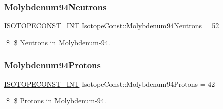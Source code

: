 \subsubsection{\texorpdfstring{Molybdenum94\+Neutrons}{Molybdenum94Neutrons}}
{\footnotesize\ttfamily \mbox{\hyperlink{group___isotope_const-_macros_ga5f18360b3e99483a35c32d789e62621c}{I\+S\+O\+T\+O\+P\+E\+C\+O\+N\+S\+T\+\_\+\+I\+NT}} Isotope\+Const\+::\+Molybdenum94\+Neutrons = 52}

\$ \$ Neutrons in Molybdenum-\/94. \mbox{\label{group___isotope_const-_molybdenum-_mo94_ga79d55ee43c5eacd646403048d3c41301}} 
\subsubsection{\texorpdfstring{Molybdenum94\+Protons}{Molybdenum94Protons}}
{\footnotesize\ttfamily \mbox{\hyperlink{group___isotope_const-_macros_ga5f18360b3e99483a35c32d789e62621c}{I\+S\+O\+T\+O\+P\+E\+C\+O\+N\+S\+T\+\_\+\+I\+NT}} Isotope\+Const\+::\+Molybdenum94\+Protons = 42}

\$ \$ Protons in Molybdenum-\/94. 